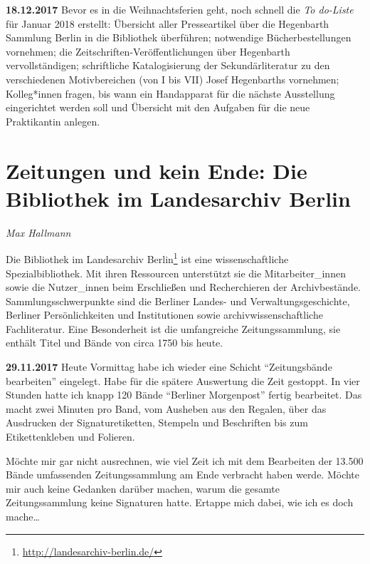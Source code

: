 \documentclass[a4paper,
fontsize=11pt,
oneside,
numbers=noperiodatend,
parskip=half-,
bibliography=totoc,
final
]{scrartcl}
\begin{document}
\textbf{18.12.2017} Bevor es in die Weihnachtsferien geht, noch schnell
die \emph{To do-Liste} für Januar 2018 erstellt: Übersicht aller
Presseartikel über die Hegenbarth Sammlung Berlin in die Bibliothek
überführen; notwendige Bücherbestellungen vornehmen; die
Zeitschriften-Veröffentlichungen über Hegenbarth vervollständigen;
schriftliche Katalogisierung der Sekundärliteratur zu den verschiedenen
Motivbereichen (von I bis VII) Josef Hegenbarths vornehmen; Kolleg*innen
fragen, bis wann ein Handapparat für die nächste Ausstellung
eingerichtet werden soll und Übersicht mit den Aufgaben für die neue
Praktikantin anlegen.

\hypertarget{zeitungen-und-kein-ende-die-bibliothek-im-landesarchiv-berlin}{%
\section*{Zeitungen und kein Ende: Die Bibliothek im Landesarchiv
Berlin}\label{zeitungen-und-kein-ende-die-bibliothek-im-landesarchiv-berlin}}

\emph{Max Hallmann}

Die Bibliothek im Landesarchiv Berlin\footnote{\url{http://landesarchiv-berlin.de/}}
ist eine wissenschaftliche Spezialbibliothek. Mit ihren Ressourcen
unterstützt sie die Mitarbeiter\_innen sowie die Nutzer\_innen beim
Erschließen und Recherchieren der Archivbestände. Sammlungsschwerpunkte
sind die Berliner Landes- und Verwaltungsgeschichte, Berliner
Persönlichkeiten und Institutionen sowie archivwissenschaftliche
Fachliteratur. Eine Besonderheit ist die umfangreiche Zeitungssammlung,
sie enthält Titel und Bände von circa 1750 bis heute.

\textbf{29.11.2017} Heute Vormittag habe ich wieder eine Schicht
\enquote{Zeitungsbände bearbeiten} eingelegt. Habe für die spätere
Auswertung die Zeit gestoppt. In vier Stunden hatte ich knapp 120 Bände
\enquote{Berliner Morgenpost} fertig bearbeitet. Das macht zwei Minuten
pro Band, vom Ausheben aus den Regalen, über das Ausdrucken der
Signaturetiketten, Stempeln und Beschriften bis zum Etikettenkleben und
Folieren.

Möchte mir gar nicht ausrechnen, wie viel Zeit ich mit dem Bearbeiten
der 13.500 Bände umfassenden Zeitungssammlung am Ende verbracht haben
werde. Möchte mir auch keine Gedanken darüber machen, warum die gesamte
Zeitungssammlung keine Signaturen hatte. Ertappe mich dabei, wie ich es
doch mache\ldots{}
\end{document}
